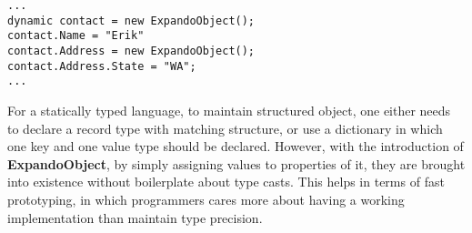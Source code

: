 \begin{verbatim}
...
dynamic contact = new ExpandoObject();
contact.Name = "Erik"
contact.Address = new ExpandoObject();
contact.Address.State = "WA";
...
\end{verbatim}

For a statically typed language, to maintain structured object,
one either needs to declare a record type with matching structure,
or use a dictionary in which one key and one value type should be declared.
However, with the introduction of \textbf{ExpandoObject},
by simply assigning values to properties of it,
they are brought into existence without boilerplate about type casts.
This helps in terms of fast prototyping, in which programmers cares more about
having a working implementation than maintain type precision.

